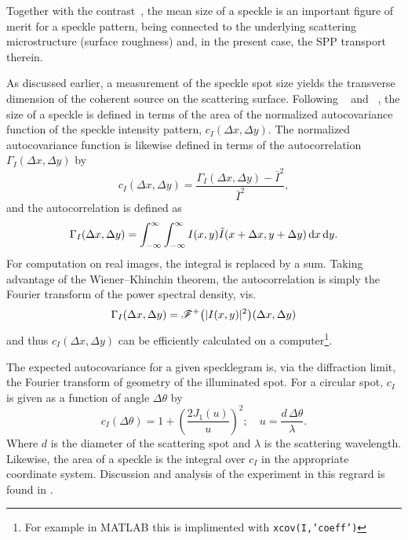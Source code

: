 Together with the contrast~\cite{goodman1975dependence}, the mean size of a
speckle is an important figure of merit for a speckle pattern, being connected
to the underlying scattering microstructure (surface roughness) and, in the
present case, the SPP transport therein.

As discussed earlier, a measurement of the speckle spot
size yields the transverse dimension of the coherent source
on the scattering surface.
Following ~\cite{goodman1975statistical} and
~\cite{dainty1975laser}, the size of a speckle is defined in
terms of the area of the normalized autocovariance function of the speckle
intensity pattern, $c_I(\Delta x, \Delta y)$.  The normalized autocovariance
function is likewise defined in terms of the autocorrelation $\Gamma_I(\Delta
x, \Delta y)$ by 
\begin{equation}
c_I(\Delta x, \Delta y) = \frac{\Gamma_I(\Delta x, \Delta y) - \bar{I}^2}{\bar{I}^2},
\label{eqn:normxcov}
\end{equation}
and the autocorrelation is defined as
\begin{equation}
\Gamma_I(\Delta x, \Delta y) = \int_{-\infty}^{\infty}\int_{-\infty}^{\infty} I(x,y) \tilde{I}(x+\Delta x,y+\Delta y) \,\mathrm{d} x \,\mathrm{d} y.
\end{equation}
For computation on real images, the integral is replaced by a sum.  Taking
advantage of the Wiener–Khinchin theorem, the autocorrelation is simply the
Fourier transform of the power spectral density, vis.
\begin{equation}
\Gamma_I(\Delta x, \Delta y) = {\mathscr{F}^{+}\bigl(|I(x,y)|^2\bigr)}(\Delta x, \Delta y)
\end{equation}
and thus  $c_I(\Delta x, \Delta y)$ can be efficiently calculated on a
computer\footnote{For example in MATLAB this is implimented with
\texttt{xcov(I,'coeff')}}.

The expected autocovariance for a given specklegram is, via the diffraction
limit, the Fourier transform of geometry of the illuminated spot.  For a
circular spot, $c_I$ is given as a function of angle $\Delta \theta$ by
\begin{equation}
c_I\left(\Delta \theta\right) = 1 + \left(\frac{2 J_1(u)}{u}\right)^2;\quad
u=\frac{d\, \Delta\theta}{\lambda}.
\label{eqn:angularsize}
\end{equation}
Where $d$ is the diameter of the scattering spot and $\lambda$ is the
scattering wavelength.  Likewise, the area of a speckle is the integral over
$c_I$ in the appropriate coordinate system.  Discussion and analysis of the
experiment in this regrard is found in .

